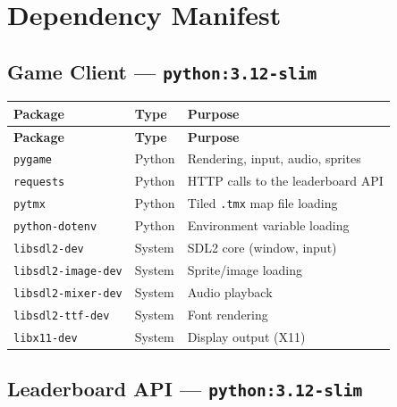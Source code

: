 \documentclass[12pt, letterpaper]{article}
\begin{document}
\section{Dependency Manifest}

\subsection{Game Client --- \texttt{python:3.12-slim}}

\begin{longtable}{p{4.5cm} p{2cm} p{7cm}}
    \toprule
    \textbf{Package} & \textbf{Type} & \textbf{Purpose} \\
    \midrule
    \endfirsthead
    \toprule
    \textbf{Package} & \textbf{Type} & \textbf{Purpose} \\
    \midrule
    \endhead
    \bottomrule
    \endfoot
    \texttt{pygame}            & Python & Rendering, input, audio, sprites \\
    \texttt{requests}          & Python & HTTP calls to the leaderboard API \\
    \texttt{pytmx}             & Python & Tiled \texttt{.tmx} map file loading \\
    \texttt{python-dotenv}     & Python & Environment variable loading \\
    \texttt{libsdl2-dev}       & System & SDL2 core (window, input) \\
    \texttt{libsdl2-image-dev} & System & Sprite/image loading \\
    \texttt{libsdl2-mixer-dev} & System & Audio playback \\
    \texttt{libsdl2-ttf-dev}   & System & Font rendering \\
    \texttt{libx11-dev}        & System & Display output (X11) \\
\end{longtable}

\subsection{Leaderboard API --- \texttt{python:3.12-slim}}
\end{document}
